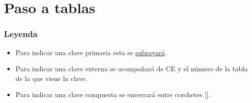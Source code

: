 \section{Paso a tablas}
\subsubsection{Leyenda}
\begin{itemize}
	\item Para indicar una clave primaria esta se \underline{subrayará}.
	\item Para indicar una clave externa se acompañará de CE y el número de la tabla de la que viene la clave.
	\item Para indicar una clave compuesta se encerrará entre corchetes [].
\end{itemize}

